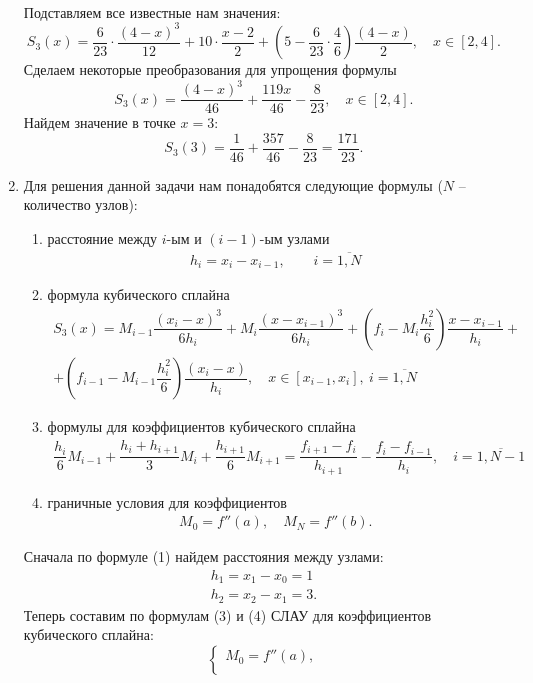\documentclass[a4paper, 12pt]{article}
\begin{document}
\begin{enumerate}
\begin{multline*}
	\end{multline*}
	Подставляем все известные нам значения:
	$$
	S_3(x) = \dfrac{6}{23}\cdot\dfrac{(4 - x)^3}{12} + 10\cdot\dfrac{x-2}{2} + \left(5 - \dfrac{6}{23}\cdot\dfrac{4}{6}\right)\dfrac{(4 - x)}{2},\quad x\in [2, 4].
	$$
	Сделаем некоторые преобразования для упрощения формулы
	$$
	S_3(x) = \dfrac{(4 - x)^3}{46} + \dfrac{119x}{46}-\dfrac{8}{23},\quad x\in [2, 4].
	$$
	Найдем значение в точке $x=3$:
	$$
	S_3(3) = \dfrac{1}{46} + \dfrac{357}{46} - \dfrac{8}{23} = \dfrac{171}{23}.
	$$
	\newpage
	\item 
	\hypertarget{t12}{}
	Для решения данной задачи нам понадобятся следующие формулы ($N$ -- количество узлов):\begin{enumerate}
		\item расстояние между $i$-ым и $(i-1)$-ым узлами \begin{eqnarray}
			h_i=x_i - x_{i-1},\qquad i=\overline{1,N}\label{1}
		\end{eqnarray}
		\item формула кубического сплайна\begin{multline}
			S_3(x) = M_{i-1}\dfrac{(x_i - x)^3}{6h_i} + M_{i}\dfrac{(x-x_{i-1})^3}{6h_i} + \left(f_i - M_i\dfrac{h_i^2}{6}\right)\dfrac{x-x_{i-1}}{h_i} +\\+ \left(f_{i-1} - M_{i-1}\dfrac{h_i^2}{6}\right)\dfrac{(x_i - x)}{h_i},\quad x\in [x_{i-1}, x_i],\ i = \overline{1,N}
		\end{multline}
		\item формулы для коэффициентов кубического сплайна
		\begin{multline}
			\dfrac{h_i}{6}M_{i-1} + \dfrac{h_i + h_{i+1}}{3}M_i + \dfrac{h_{i+1}}{6}M_{i+1} = \dfrac{f_{i+1} - f_i}{h_{i+1}} - \dfrac{f_i - f_{i-1}}{h_i},\quad i = \overline {1,N-1}
		\end{multline}
		\item граничные условия для коэффициентов \begin{eqnarray}
			M_0 = f''(a),\quad M_N = f''(b).
		\end{eqnarray}
	\end{enumerate}
	Сначала по формуле (1) найдем расстояния между узлами:
	$$\begin{matrix}
		h_1 = x_1 - x_0 = 1\\
		h_2 = x_2 - x_1 = 3.
	\end{matrix}$$
	Теперь составим по формулам (3) и (4) СЛАУ для коэффициентов кубического сплайна:
	$$\begin{cases}
		M_0 = f''(a),\\

\end{cases}$$
\end{enumerate}
\end{document}
